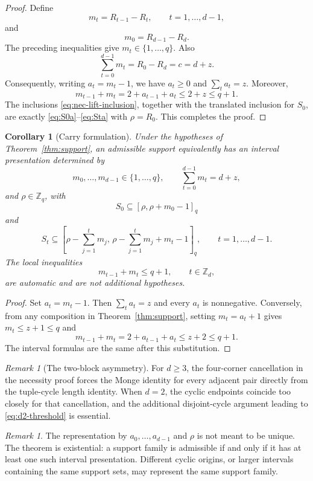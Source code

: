 \documentclass[11pt]{article}
\newtheorem{corollary}[theorem]{Corollary}
\theoremstyle{definition}
\theoremstyle{remark}
\newtheorem{remark}[theorem]{Remark}
\begin{document}
\begin{proof}
Define
\[
        m_t=R_{t-1}-R_t,
        \qquad t=1,\ldots,d-1,
\]
and
\[
        m_0=R_{d-1}-R_d .
\]
The preceding inequalities give $m_t\in\{1,\ldots,q\}$.  Also
\[
        \sum_{t=0}^{d-1}m_t=R_0-R_d=c=d+z .
\]
Consequently, writing $a_t=m_t-1$, we have $a_t\ge0$ and $\sum_t a_t=z$. Moreover,
\[
        m_{t-1}+m_t=2+a_{t-1}+a_t\le 2+z\le q+1 .
\]
The inclusions \eqref{eq:nec-lift-inclusion}, together with the translated inclusion for $S_0$, are exactly \eqref{eq:S0a}--\eqref{eq:Sta} with $\rho=R_0$. This completes the proof.
\end{proof}

\begin{corollary}[Carry formulation]
\label{cor:carry}
Under the hypotheses of Theorem~\ref{thm:support}, an admissible support equivalently has an interval presentation determined by
\[
        m_0,\ldots,m_{d-1}\in\{1,\ldots,q\},
        \qquad
        \sum_{t=0}^{d-1}m_t=d+z,
\]
and $\rho\in\mathbb Z_q$, with
\[
        S_0\subseteq[\rho,\rho+m_0-1]_q
\]
and
\[
        S_t\subseteq
        \left[
        \rho-\sum_{j=1}^t m_j,\,
        \rho-\sum_{j=1}^t m_j+m_t-1
        \right]_q,
        \qquad t=1,\ldots,d-1.
\]
The local inequalities
\[
        m_{t-1}+m_t\le q+1,
        \qquad t\in\mathbb Z_d,
\]
are automatic and are not additional hypotheses.
\end{corollary}

\begin{proof}
Set $a_t=m_t-1$. Then $\sum_t a_t=z$ and every $a_t$ is nonnegative. Conversely, from any composition in Theorem~\ref{thm:support}, setting $m_t=a_t+1$ gives $m_t\le z+1\le q$ and
\[
        m_{t-1}+m_t
        =2+a_{t-1}+a_t
        \le z+2\le q+1.
\]
The interval formulas are the same after this substitution.
\end{proof}

\begin{remark}[The two-block asymmetry]
For $d\ge3$, the four-corner cancellation in the necessity proof forces the Monge identity for every adjacent pair directly from the tuple-cycle length identity. When $d=2$, the cyclic endpoints coincide too closely for that cancellation, and the additional disjoint-cycle argument leading to \eqref{eq:d2-threshold} is essential.
\end{remark}

\begin{remark}
The representation by $a_0,\ldots,a_{d-1}$ and $\rho$ is not meant to be unique.  The theorem is existential: a support family is admissible if and only if it has at least one such interval presentation.  Different cyclic origins, or larger intervals containing the same support sets, may represent the same support family.
\end{remark}
\end{document}
